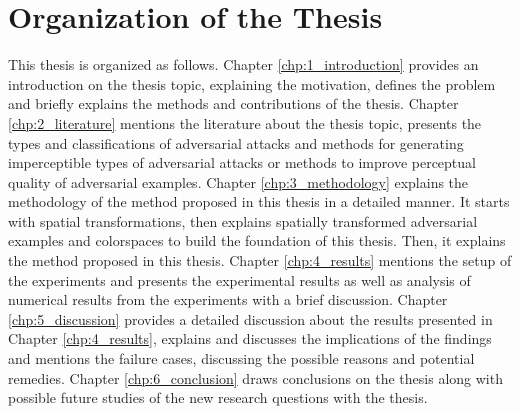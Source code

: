 \section{Organization of the Thesis}
This thesis is organized as follows. Chapter \ref{chp:1_introduction} provides an introduction on the thesis topic, explaining the motivation, defines the problem and briefly explains the methods and contributions of the thesis. Chapter \ref{chp:2_literature} mentions the literature about the thesis topic, presents the types and classifications of adversarial attacks and methods for generating imperceptible types of adversarial attacks or methods to improve perceptual quality of adversarial examples. Chapter \ref{chp:3_methodology} explains the methodology of the method proposed in this thesis in a detailed manner. It starts with spatial transformations, then explains spatially transformed adversarial examples and colorspaces to build the foundation of this thesis. Then, it explains the method proposed in this thesis. Chapter \ref{chp:4_results} mentions the setup of the experiments and presents the experimental results as well as analysis of numerical results from the experiments with a brief discussion. Chapter \ref{chp:5_discussion} provides a detailed discussion about the results presented in Chapter \ref{chp:4_results}, explains and discusses the implications of the findings and mentions the failure cases, discussing the possible reasons and potential remedies. Chapter \ref{chp:6_conclusion} draws conclusions on the thesis along with possible future studies of the new research questions with the thesis.
